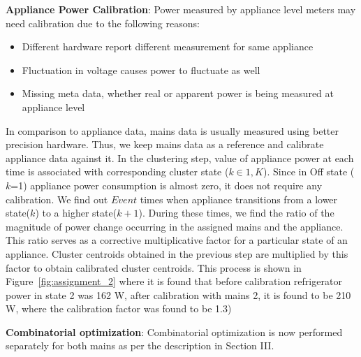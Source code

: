 \documentclass[conference]{IEEEtran}
\newcommand{\figref}[1]{Figure~\ref{#1}}
\begin{document}
\noindent\textbf{Appliance Power Calibration}: 
Power measured by appliance level meters may need calibration due to the following reasons:
\begin{itemize}
\item Different hardware report different measurement for same appliance \cite{berges2008}
\item Fluctuation in voltage causes power to fluctuate as well\cite{hart}
\item Missing meta data, whether real or apparent power is being measured at appliance level

\end{itemize} In comparison to appliance data, mains data is usually measured using better precision hardware. Thus, we keep mains data as a reference and calibrate appliance data against it. In the clustering step, value of appliance power at each time is associated with corresponding cluster state ($k \in {1,K}$). Since in Off state ($k$=1) appliance power consumption is almost zero, it does not require any calibration. We find out $Event$ times when appliance transitions from a lower state($k$) to a higher state($k+1$). During these times, we find the ratio of the magnitude of power change occurring in the assigned mains and the appliance. This ratio serves as a corrective multiplicative factor for a particular  state of an appliance. Cluster centroids obtained in the previous step are multiplied by this factor to obtain calibrated cluster centroids.
This process is shown in \figref{fig:assignment_2} where it is found that before calibration refrigerator power in state 2 was 162 W, after calibration with mains 2, it is found to be 210 W, where the calibration factor was found to be 1.3)

\noindent\textbf{Combinatorial optimization}: Combinatorial optimization is now performed separately for both mains as per the description in Section III.
\end{document}
